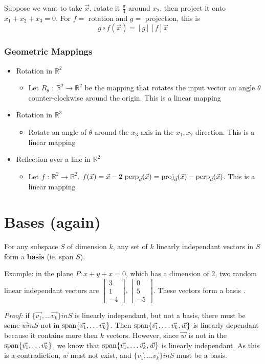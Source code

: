 \documentclass[12pt]{article}
\newcommand{\perpp}[2]{{\rm perp}_{\vec{#2}} (\vec{#1})}
\newcommand{\proj}[2]{{\rm proj}_{\vec{#2}} (\vec{#1})}
\newcommand{\R}[1]{\mathbb{R}^{#1}}
\newcommand{\spanv}[1]{{\rm span}\{#1\}}
\newcommand{\vecthree}[3]{\begin{bmatrix}#1\\#2\\#3\end{bmatrix}}
\begin{document}
Suppose we want to take $\vec{x}$, rotate it $\frac{\pi}{4}$ around $x_2$, then project it onto $x_1 + x_2 + x_3 = 0$. For $f=$ rotation and $g=$ projection, this is \[ g\circ f(\vec{x}) = [g][f]\vec{x} \]

\subsubsection*{Geometric Mappings}
\begin{itemize}
\item{Rotation in $\R{2}$}
\begin{itemize}
\item{Let $R_\theta$ : $\R{2} \to \R{2}$ be the mapping that rotates the input vector an angle $\theta$ counter-clockwise around the origin. This is a linear mapping}
\end{itemize}
\item{Rotation in $\R{3}$}
\begin{itemize}
\item{Rotate an angle of $\theta$ around the $x_3$-axis in the $x_1,x_2$ direction. This is a linear mapping}
\end{itemize}
\item{Reflection over a line in $\R{2}$}
\begin{itemize}
\item{Let $f$ : $\R{2} \to \R{2}$. $f(\vec{x}) = \vec{x} - 2\ \perpp{x}{d} = \proj{x}{d} - \perpp{x}{d}$. This is a linear mapping}
\end{itemize}
\end{itemize}

\section*{Bases (again)}
For any subspace $S$ of dimension $k$, any set of $k$ linearly independant vectors in $S$ form a {\bf basis} (ie. span $S$).

Example: in the plane $P: x + y + x = 0$, which has a dimension of 2, two random linear independant vectors are $\vecthree{3}{1}{-4},\vecthree{0}{5}{-5}$. These vectors form a basis .

\textit{Proof:} if $\{\vec{v_1},\dots \vec{v_k}\}in S$ is linearly independant, but not a basis, there must be some $\vec{w}in S$ not in $\spanv{\vec{v_1},\dots \vec{v_k}}$. Then $\spanv{\vec{v_1},\dots \vec{v_k}, \vec{w}}$ is linearly dependant because it contains more then $k$ vectors. However, since $\vec{w}$ is not in the $\spanv{\vec{v_1},\dots \vec{v_k}}$, we know that $\spanv{\vec{v_1},\dots \vec{v_k}, \vec{w}}$ is linearly independant. As this is a contradiction, $\vec{w}$ must not exist, and $\{\vec{v_1},\dots \vec{v_k}\}in S$ must be a basis.
\end{document}
